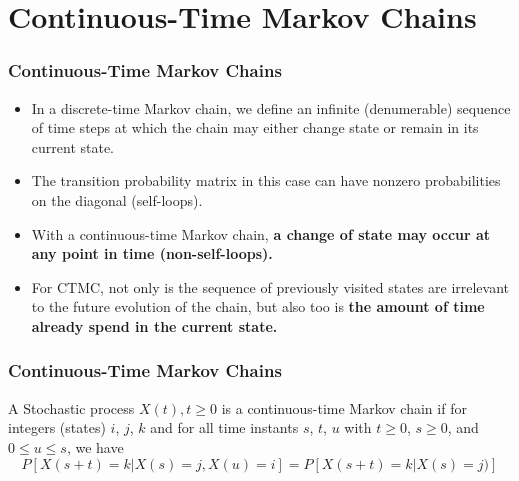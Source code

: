 \section{Continuous-Time Markov Chains}






\begin{frame}
    \frametitle{Continuous-Time Markov Chains}
        \begin{itemize}
            \item In a discrete-time Markov chain, we define an infinite (denumerable) sequence of time steps at 
            which the chain may either change state or remain in its current state.

            \item The transition probability matrix in this case can have nonzero probabilities on the 
            diagonal (self-loops).

            \item With a continuous-time Markov chain, \textbf{a change of state may occur at any point in time (non-self-loops).}

            \item For CTMC, not only is the sequence of previously visited states are irrelevant to the future evolution
            of the chain, but also too is \textbf{the amount of time already spend in the current state.}

        \end{itemize}
\end{frame}




\begin{frame}
    \frametitle{Continuous-Time Markov Chains}
        \begin{definition}
            A Stochastic process ${X(t), t\geq 0}$ is a continuous-time Markov chain if for
            integers (states) $i$, $j$, $k$ and for all time instants $s$, $t$, $u$ with 
            $t\geq 0$, $s\geq 0$, and $0\leq u \leq s$, we have
            \small
            $$P[X(s+t) = k|X(s)=j, X(u)=i]=P[X(s+t)=k|X(s)=j)]$$
        \end{definition}
\end{frame}




